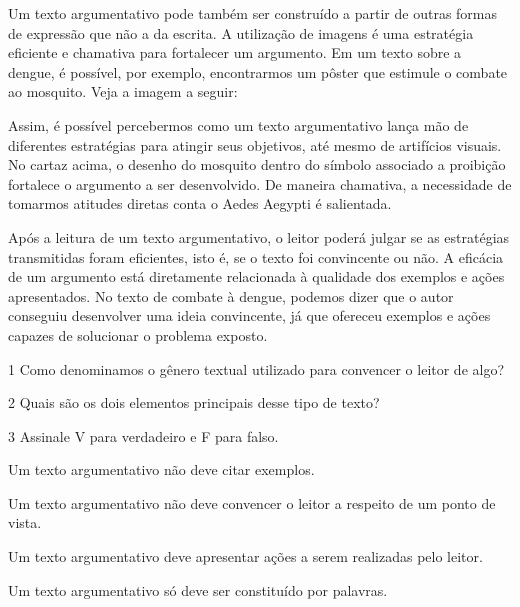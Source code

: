 {Um texto argumentativo pode também ser construído a partir de outras
formas de expressão que não a da escrita. A utilização de imagens é uma
estratégia eficiente e chamativa para fortalecer um argumento. Em um
texto sobre a dengue, é possível, por exemplo, encontrarmos um pôster
que estimule o combate ao mosquito. Veja a imagem a seguir:


Assim, é possível percebermos como um texto argumentativo lança mão de
diferentes estratégias para atingir seus objetivos, até mesmo de
artifícios visuais. No cartaz acima, o desenho do mosquito dentro do
símbolo associado a proibição fortalece o argumento a ser desenvolvido.
De maneira chamativa, a necessidade de tomarmos atitudes diretas conta o
Aedes Aegypti é salientada.

Após a leitura de um texto argumentativo, o leitor poderá julgar se as
estratégias transmitidas foram eficientes, isto é, se o texto foi
convincente ou não. A eficácia de um argumento está diretamente
relacionada à qualidade dos exemplos e ações apresentados. No texto de
combate à dengue, podemos dizer que o autor conseguiu desenvolver uma
ideia convincente, já que ofereceu exemplos e ações capazes de
solucionar o problema exposto.}


\num{1} Como denominamos o gênero textual utilizado para convencer o leitor
de algo?



\num{2} Quais são os dois elementos principais desse tipo de texto?



\num{3} Assinale V para verdadeiro e F para falso.

\begin{boxlist}
\item Um texto argumentativo não deve citar exemplos. 

\item Um texto argumentativo não deve convencer o leitor a respeito de 
um ponto de vista. 

\item Um texto argumentativo deve apresentar ações a serem realizadas pelo leitor.  

\item Um texto argumentativo só deve ser constituído por palavras. 
\end{boxlist}

